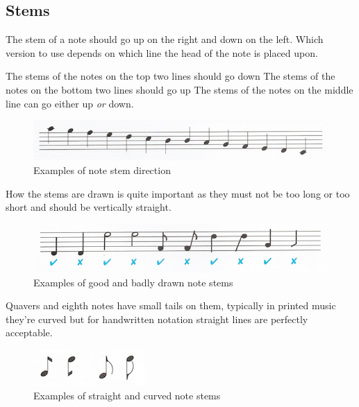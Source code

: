 \subsection{Stems}

The stem of a note should go up on the right and down on the left. Which version to use depends on which line the head of the note is placed upon.

The stems of the notes on the top two lines should go down
The stems of the notes on the bottom two lines should go up
The stems of the notes on the middle line can go either up \emph{or} down.

\begin{figure}[h!]
  \includegraphics[width=\linewidth]{gfx/basic/stems-chromatic.png}
  \centering
  \caption{Examples of note stem direction}
  \label{fig:StemsChromatic}
\end{figure}

How the stems are drawn is quite important as they must not be too long or too short and should be vertically straight.

\begin{figure}[h!]
  \includegraphics[width=\linewidth]{gfx/basic/stems-good-bad.png}
  \centering
  \caption{Examples of good and badly drawn note stems}
  \label{fig:StemsGoodBad}
\end{figure}

Quavers and eighth notes have small tails on them, typically in printed music they're curved but for handwritten notation straight lines are perfectly acceptable.

\begin{figure}[h!]
  \includegraphics[width=0.4\linewidth]{gfx/basic/stems-curved.png}
  \centering
  \caption{Examples of straight and curved note stems}
  \label{fig:StemsStraightCurved}
\end{figure}

